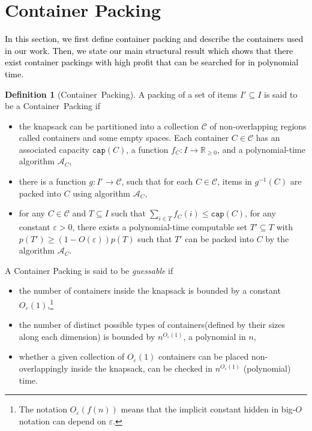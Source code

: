 \documentclass[10pt,a4paper]{amsart}
\newcommand{\kvnnew}[1]{\textcolor{black}{#1}}
\newcommand{\kvn}[1]{#1}
\newcommand{\kvnr}[1]{}
\newcommand{\eps}{\varepsilon}
\renewcommand{\epsilon}{\varepsilon} %
\newcommand{\AM}{\mathcal{A}}
\newcommand{\CC}{\mathcal{C}}
\newcommand{\boxes}{containers\xspace}
\newcommand{\Container}{Container~}
\theoremstyle{definition}
\newtheorem{definition}{Definition}[section]
\begin{document}
\section{Container Packing}
\label{subsec:cp}
\kvnnew{In this section, we first define container packing and describe the containers used in our work.
Then, we state our main structural result which shows that there exist container packings with high profit that can be searched for in polynomial time.}
\begin{definition}[\Container Packing]
    A packing of a set of items $I' \subseteq I$ is said to be a \Container Packing if \kvnr{changed $T, T', T''$}
    \begin{itemize}
        \item the knapsack can be partitioned into a collection $\CC$ of non-overlapping regions called \boxes and some empty spaces. Each container $C \in \CC$ has an associated capacity $\mathtt{cap}(C)$, a function $f_C \colon I \rightarrow \mathbb{R}_{\ge 0}$, and a polynomial-time algorithm $\AM_C$,
        \item there is a function $g \colon I' \rightarrow \CC$, such that for each $C\in \CC$, items in $g^{-1}(C)$ are packed into $C$ using algorithm $\AM_C$,
        \item for any $C\in \CC$ and $T\subseteq I$ such that $\sum_{i\in T} f_C(i) \le \mathtt{cap}(C)$, for any constant $\eps > 0$, there exists a polynomial-time computable set $T' \subseteq T$ with $p(T')\ge (1-O(\epsilon))p(T)$ such that $T'$ can be packed into $C$ by the algorithm $\AM_C$. 
    \end{itemize}
\end{definition}

A Container Packing is said to be \textit{guessable} if 
\begin{itemize}
    \item the number of \boxes inside the knapsack is bounded by a constant $O_\eps(1)$,\footnote{The notation $O_{\eps}(f(n))$ means that the implicit constant hidden in big-$O$ notation can depend on $\eps$.}
    \item the number of distinct possible types of \boxes (defined by their sizes along each dimension) is bounded by \kvn{$n^{O_\eps(1)}$, a polynomial in $n$},
    \item whether a given collection of $O_{\epsilon}(1)$ \boxes can be placed non-overlappingly inside the knapsack, can be checked in \kvn{$n^{O_{\eps}(1)}$ (polynomial) time}.
\end{itemize}
\end{document}
